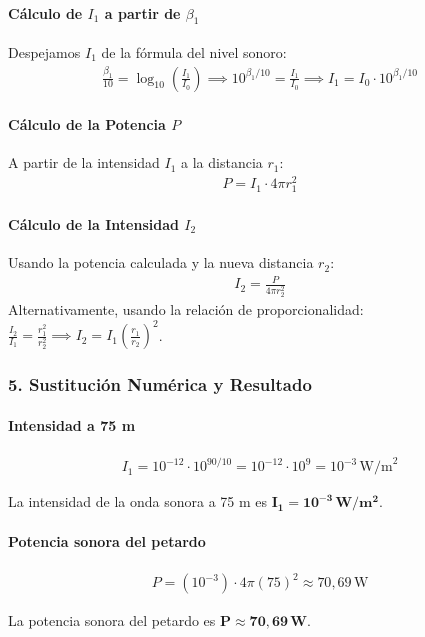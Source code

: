 \paragraph*{Cálculo de $I_1$ a partir de $\beta_1$}
Despejamos $I_1$ de la fórmula del nivel sonoro:
\begin{gather}
    \frac{\beta_1}{10} = \log_{10} \left( \frac{I_1}{I_0} \right) \implies 10^{\beta_1/10} = \frac{I_1}{I_0} \implies I_1 = I_0 \cdot 10^{\beta_1/10}
\end{gather}
\paragraph*{Cálculo de la Potencia $P$}
A partir de la intensidad $I_1$ a la distancia $r_1$:
\begin{gather}
    P = I_1 \cdot 4\pi r_1^2
\end{gather}
\paragraph*{Cálculo de la Intensidad $I_2$}
Usando la potencia calculada y la nueva distancia $r_2$:
\begin{gather}
    I_2 = \frac{P}{4\pi r_2^2}
\end{gather}
Alternativamente, usando la relación de proporcionalidad: $\frac{I_2}{I_1} = \frac{r_1^2}{r_2^2} \implies I_2 = I_1 \left( \frac{r_1}{r_2} \right)^2$.

\subsubsection*{5. Sustitución Numérica y Resultado}
\paragraph*{Intensidad a 75 m}
\begin{gather}
    I_1 = 10^{-12} \cdot 10^{90/10} = 10^{-12} \cdot 10^9 = 10^{-3} \, \text{W/m}^2
\end{gather}
\begin{cajaresultado}
    La intensidad de la onda sonora a 75 m es $\boldsymbol{I_1 = 10^{-3} \, W/m^2}$.
\end{cajaresultado}
\paragraph*{Potencia sonora del petardo}
\begin{gather}
    P = (10^{-3}) \cdot 4\pi (75)^2 \approx 70,69 \, \text{W}
\end{gather}
\begin{cajaresultado}
    La potencia sonora del petardo es $\boldsymbol{P \approx 70,69 \, W}$.
\end{cajaresultado}
